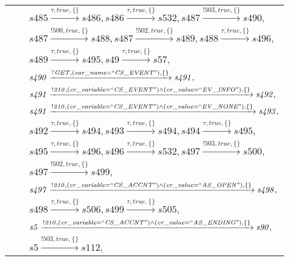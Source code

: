 \begin{tabular}{lcl}
& & $\mathit{s485}\xrightarrow{\mathit{\tau}, \mathit{true}, \{\}}\mathit{s486},\mathit{s486}\xrightarrow{\mathit{\tau}, \mathit{true}, \{\}}\mathit{s532},\mathit{s487}\xrightarrow{\mathit{!503}, \mathit{true}, \{\}}\mathit{s490},$ \\
& & $\mathit{s487}\xrightarrow{\mathit{!500}, \mathit{true}, \{\}}\mathit{s488},\mathit{s487}\xrightarrow{\mathit{!502}, \mathit{true}, \{\}}\mathit{s489},\mathit{s488}\xrightarrow{\mathit{\tau}, \mathit{true}, \{\}}\mathit{s496},$ \\
& & $\mathit{s489}\xrightarrow{\mathit{\tau}, \mathit{true}, \{\}}\mathit{s495},\mathit{s49}\xrightarrow{\mathit{\tau}, \mathit{true}, \{\}}\mathit{s57},$ \\
& & $\mathit{s490}\xrightarrow{\mathit{?GET}, \mathit{(var\_name = ``CS\_EVENT")}, \{\}}\mathit{s491},$ \\
& & $\mathit{s491}\xrightarrow{\mathit{!210}, \mathit{(cr\_variable = ``CS\_EVENT") \land (cr\_value = ``EV\_INFO")}, \{\}}\mathit{s492},$ \\
& & $\mathit{s491}\xrightarrow{\mathit{!210}, \mathit{(cr\_variable = ``CS\_EVENT") \land (cr\_value = ``EV\_NONE")}, \{\}}\mathit{s493},$ \\
& & $\mathit{s492}\xrightarrow{\mathit{\tau}, \mathit{true}, \{\}}\mathit{s494},\mathit{s493}\xrightarrow{\mathit{\tau}, \mathit{true}, \{\}}\mathit{s494},\mathit{s494}\xrightarrow{\mathit{\tau}, \mathit{true}, \{\}}\mathit{s495},$ \\
& & $\mathit{s495}\xrightarrow{\mathit{\tau}, \mathit{true}, \{\}}\mathit{s496},\mathit{s496}\xrightarrow{\mathit{\tau}, \mathit{true}, \{\}}\mathit{s532},\mathit{s497}\xrightarrow{\mathit{!503}, \mathit{true}, \{\}}\mathit{s500},$ \\
& & $\mathit{s497}\xrightarrow{\mathit{!502}, \mathit{true}, \{\}}\mathit{s499},$ \\
& & $\mathit{s497}\xrightarrow{\mathit{!210}, \mathit{(cr\_variable = ``CS\_ACCNT") \land (cr\_value = ``AS\_OPEN")}, \{\}}\mathit{s498},$ \\
& & $\mathit{s498}\xrightarrow{\mathit{\tau}, \mathit{true}, \{\}}\mathit{s506},\mathit{s499}\xrightarrow{\mathit{\tau}, \mathit{true}, \{\}}\mathit{s505},$ \\
& & $\mathit{s5}\xrightarrow{\mathit{!210}, \mathit{(cr\_variable = ``CS\_ACCNT") \land (cr\_value = ``AS\_ENDING")}, \{\}}\mathit{s90},$ \\
& & $\mathit{s5}\xrightarrow{\mathit{!503}, \mathit{true}, \{\}}\mathit{s112},$ \\

\end{tabular}
